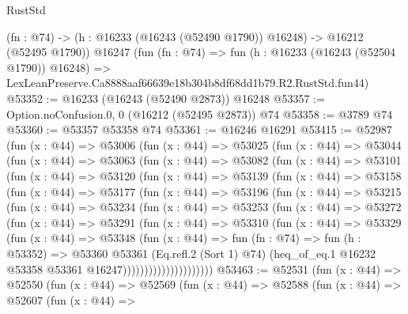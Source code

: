 \begin{lexlean}{RustStd}
\begin{coremodule}
    (fn : @74) -> (h : @16233 (@16243 (@52490 @1790)) @16248) -> @16212 (@52495 @1790))
    @16247
    (fun (fn : @74) =>
    fun (h : @16233 (@16243 (@52504 @1790)) @16248) =>
    LexLeanPreserve.Ca8888aaf66639e18b304b8df68dd1b79.R2.RustStd.fun44)
@53352 := @16233 (@16243 (@52490 @2873)) @16248
@53357 := Option.noConfusion.{0, 0} (@16212 (@52495 @2873)) @74
@53358 := @3789 @74
@53360 := @53357 @53358 @74
@53361 := @16246 @16291
@53415 := @52987
    (fun (x : @44) =>
    @53006
      (fun (x : @44) =>
      @53025
        (fun (x : @44) =>
        @53044
          (fun (x : @44) =>
          @53063
            (fun (x : @44) =>
            @53082
              (fun (x : @44) =>
              @53101
                (fun (x : @44) =>
                @53120
                  (fun (x : @44) =>
                  @53139
                    (fun (x : @44) =>
                    @53158
                      (fun (x : @44) =>
                      @53177
                        (fun (x : @44) =>
                        @53196
                          (fun (x : @44) =>
                          @53215
                            (fun (x : @44) =>
                            @53234
                              (fun (x : @44) =>
                              @53253
                                (fun (x : @44) =>
                                @53272
                                  (fun (x : @44) =>
                                  @53291
                                    (fun (x : @44) =>
                                    @53310
                                      (fun (x : @44) =>
                                      @53329
                                        (fun (x : @44) =>
                                        @53348
                                          (fun (x : @44) =>
                                          fun (fn : @74) =>
                                          fun (h : @53352) =>
                                          @53360
                                            @53361
                                            (Eq.refl.{2} (Sort 1) @74)
                                            (heq_of_eq.{1}
                                              @16232
                                              @53358
                                              @53361
                                              @16247)))))))))))))))))))))
@53463 := @52531
    (fun (x : @44) =>
    @52550
      (fun (x : @44) =>
      @52569
        (fun (x : @44) =>
        @52588
          (fun (x : @44) =>
          @52607
            (fun (x : @44) =>

\end{coremodule}
\end{lexlean}
